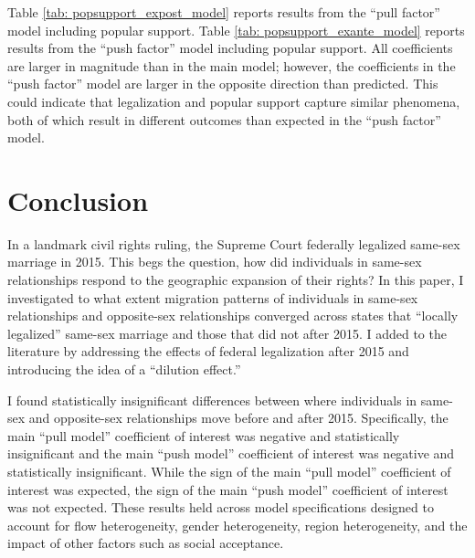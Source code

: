 \documentclass[12pt,letterpaper]{article}
\begin{document}
Table \ref{tab: popsupport_expost_model} reports results from the “pull factor” model including popular support. Table \ref{tab: popsupport_exante_model} reports results from the “push factor” model including popular support. All coefficients are larger in magnitude than in the main model; however, the coefficients in the “push factor” model are larger in the opposite direction than predicted. This could indicate that legalization and popular support capture similar phenomena, both of which result in different outcomes than expected in the “push factor” model.

\begin{table}[h] %
    \centering
    
    \caption{}
    \label{tab: popsupport_expost_model}
\end{table}
\begin{table}[h]
    \centering
    
    \caption{}
    \label{tab: popsupport_exante_model}
\end{table}

\section{Conclusion}

In a landmark civil rights ruling, the Supreme Court federally legalized same-sex marriage in 2015. This begs the question, how did individuals in same-sex relationships respond to the geographic expansion of their rights? In this paper, I investigated to what extent migration patterns of individuals in same-sex relationships and opposite-sex relationships converged across states that “locally legalized” same-sex marriage and those that did not after 2015. I added to the literature by addressing the effects of federal legalization after 2015 and introducing the idea of a “dilution effect.”

I found statistically insignificant differences between where individuals in same-sex and opposite-sex relationships move before and after 2015. Specifically, the main “pull model” coefficient of interest was negative and statistically insignificant and the main “push model” coefficient of interest was negative and statistically insignificant. While the sign of the main “pull model” coefficient of interest was expected, the sign of the main “push model” coefficient of interest was not expected. These results held across model specifications designed to account for flow heterogeneity, gender heterogeneity, region heterogeneity, and the impact of other factors such as social acceptance. 
\end{document}
